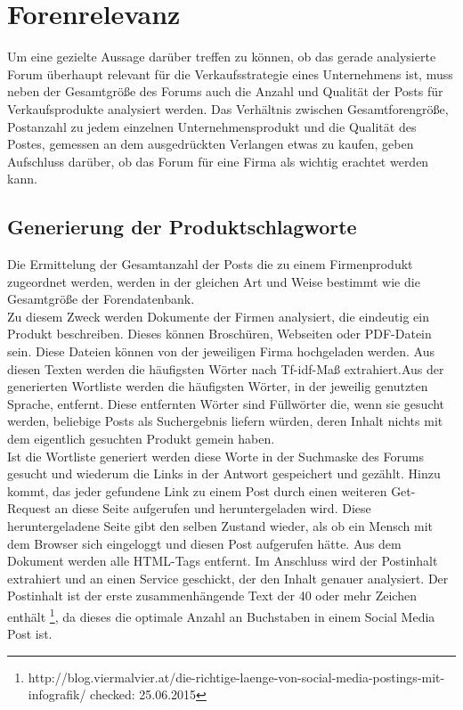 \section{Forenrelevanz}
Um eine gezielte Aussage darüber treffen zu können, ob das gerade analysierte Forum überhaupt relevant für die Verkaufsstrategie eines Unternehmens ist, muss neben der Gesamtgröße des Forums auch die Anzahl und Qualität der Posts für Verkaufsprodukte analysiert werden. Das Verhältnis zwischen Gesamtforengröße, Postanzahl zu jedem einzelnen Unternehmensprodukt und die Qualität des Postes, gemessen an dem ausgedrückten Verlangen etwas zu kaufen, geben Aufschluss darüber, ob das Forum für eine Firma als wichtig erachtet werden kann.
\subsection{Generierung der Produktschlagworte}
Die Ermittelung der Gesamtanzahl der Posts die zu einem Firmenprodukt zugeordnet werden, werden in der gleichen Art und Weise bestimmt wie die Gesamtgröße der Forendatenbank.\\
Zu diesem Zweck werden Dokumente der Firmen analysiert, die eindeutig ein Produkt beschreiben. Dieses können Broschüren, Webseiten oder PDF-Datein sein. Diese Dateien können von der jeweiligen Firma hochgeladen werden. Aus diesen Texten werden die häufigsten Wörter nach Tf-idf-Maß extrahiert.Aus der generierten Wortliste werden die häufigsten Wörter, in der jeweilig genutzten Sprache, entfernt. Diese entfernten Wörter sind Füllwörter die, wenn sie gesucht werden, beliebige Posts als Suchergebnis liefern würden, deren Inhalt nichts mit dem eigentlich gesuchten Produkt gemein haben.\\
Ist die Wortliste generiert werden diese Worte in der Suchmaske des Forums gesucht und wiederum die Links in der Antwort gespeichert und gezählt. Hinzu kommt, das jeder gefundene Link zu einem Post durch einen weiteren Get-Request an diese Seite aufgerufen und heruntergeladen wird. Diese heruntergeladene Seite gibt den selben Zustand wieder, als ob ein Mensch mit dem Browser sich eingeloggt und diesen Post aufgerufen hätte. Aus dem Dokument werden alle HTML-Tags entfernt. Im Anschluss wird der Postinhalt extrahiert und an einen Service geschickt, der den Inhalt genauer analysiert. Der Postinhalt ist der erste zusammenhängende Text der 40 oder mehr Zeichen enthält \footnote{http://blog.viermalvier.at/die-richtige-laenge-von-social-media-postings-mit-infografik/ checked: 25.06.2015}, da dieses die optimale Anzahl an Buchstaben in einem Social Media Post ist.
